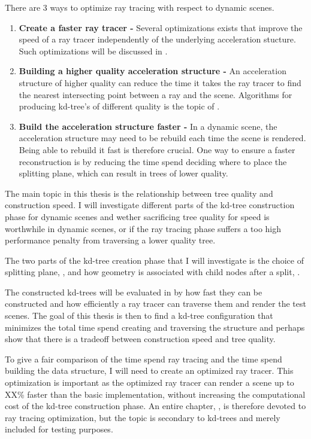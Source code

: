 There are 3 ways to optimize ray tracing with respect to dynamic
scenes. 

\begin{enumerate}
  \item \textbf{Create a faster ray tracer -} Several optimizations
    exists that improve the speed of a ray tracer independently of the
    underlying acceleration stucture. Such optimizations will be
    discussed in .
  \item \textbf{Building a higher quality acceleration structure -} An
    acceleration structure of higher quality can reduce the time it
    takes the ray tracer to find the nearest intersecting point
    between a ray and the scene. Algorithms for producing kd-tree's
    of different quality is the topic of
    .
  \item \textbf{Build the acceleration structure faster -} In a
    dynamic scene, the acceleration structure may need to be rebuild
    each time the scene is rendered. Being able to rebuild it fast is
    therefore crucial. One way to ensure a faster reconstruction is by
    reducing the time spend deciding where to place the splitting
    plane, which can result in trees of lower quality.
\end{enumerate}

The main topic in this thesis is the relationship between tree quality
and construction speed. I will investigate different parts of the
kd-tree construction phase for dynamic scenes and wether sacrificing
tree quality for speed is worthwhile in dynamic scenes, or if the ray
tracing phase suffers a too high performance penalty from traversing a
lower quality tree.

The two parts of the kd-tree creation phase that I will investigate is
the choice of splitting plane, , and
how geometry is associated with child nodes after a split,
.

The constructed kd-trees will be evaluated in 
by how fast they can be constructed and how efficiently a ray tracer
can traverse them and render the test scenes. The goal of this thesis
is then to find a kd-tree configuration that minimizes the total time
spend creating and traversing the structure and perhaps show that
there is a tradeoff between construction speed and tree quality.

To give a fair comparison of the time spend ray tracing and the time
spend building the data structure, I will need to create an optimized
ray tracer. This optimization is important as the optimized ray tracer
can render a scene up to XX\% faster than the basic implementation,
without increasing the computational cost of the kd-tree construction
phase. An entire chapter, , is therefore
devoted to ray tracing optimization, but the topic is secondary to
kd-trees and merely included for testing purposes.

